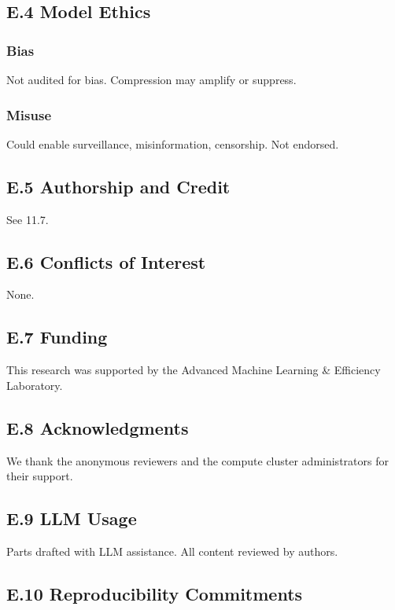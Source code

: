\subsection{E.4 Model Ethics}

\subsubsection{Bias}

Not audited for bias. Compression may amplify or suppress.

\subsubsection{Misuse}

Could enable surveillance, misinformation, censorship. Not endorsed.

\subsection{E.5 Authorship and Credit}

See  11.7.

\subsection{E.6 Conflicts of Interest}

None.

\subsection{E.7 Funding}

This research was supported by the Advanced Machine Learning & Efficiency Laboratory.

\subsection{E.8 Acknowledgments}

We thank the anonymous reviewers and the compute cluster administrators for their support.

\subsection{E.9 LLM Usage}

Parts drafted with LLM assistance. All content reviewed by authors.

\subsection{E.10 Reproducibility Commitments}

